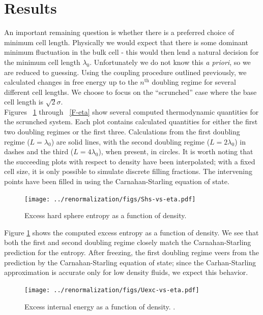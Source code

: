 \documentclass[12pt]{article}
\newcommand{\ignore}[1]{}
\begin{document}
\section{Results}
An important remaining question is whether there is a preferred choice of minimum cell length. Physically we would expect that there is some dominant minimum fluctuation in the bulk cell - this would then lend a natural decision for the minimum cell length $\lambda_0$. Unfortunately we do not know this {\it a priori}, so we are reduced to guessing. Using the coupling procedure outlined previously, we calculated changes in free energy up to the $n^{\text{th}}$ doubling regime for several different cell lengths. We choose to focus on the ``scrunched'' case where the base cell length is $\sqrt2\sigma$.\\

Figures ~\ref{Shs-eta} through ~\ref{F-eta} show several computed thermodynamic quantities for the scrunched system. Each plot contains calculated quantities for either the first two doubling regimes or the first three. Calculations from the first doubling regime ($L=\lambda_0$) are solid lines, with the second doubling regime ($L = 2\lambda_0$) in dashes and the third ($L = 4\lambda_0$), when present, in circles. It is worth noting that the succeeding plots with respect to density have been interpolated; with a fixed cell size, it is only possible to simulate discrete filling fractions. The intervening points have been filled in using the Carnahan-Starling equation of state.\\  
\ignore{\begin{figure}  
\centering
    \texttt{[image: ../renormalization/figs/Fexc-vs-T.pdf]}
    \caption{Excess specific free energy as a function of temperature.}
    \label{F-T}
\end{figure}}

\begin{figure}
\centering
    \texttt{[image: ../renormalization/figs/Shs-vs-eta.pdf]}
    \caption{Excess hard sphere entropy as a function of density.}
    \label{Shs-eta}
\end{figure}
\ignore{Filling fraction or density? Value in distinction? We never use number density for the sake of units...}
Figure \ref{Shs-eta} shows the computed excess entropy as a function of density. We see that both the first and second doubling regime closely match the Carnahan-Starling prediction for the entropy. After freezing, the first doubling regime veers from the prediction by the Carnahan-Starling equation of state; since the Carhan-Starling approximation is accurate only for low density fluids, we expect this behavior.\\
\begin{figure}
    \centering
    \texttt{[image: ../renormalization/figs/Uexc-vs-eta.pdf]}
    \caption{Excess internal energy as a function of density. .}
    \label{U-eta}
\end{figure}
\end{document}
